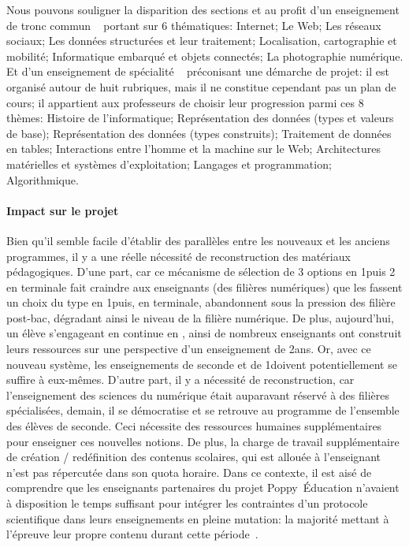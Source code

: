             Nous pouvons souligner la disparition des sections  et  au profit d'un enseignement de tronc commun ~ portant sur 6 thématiques: Internet; Le Web; Les réseaux sociaux; Les données structurées et leur traitement; Localisation, cartographie et mobilité; Informatique embarqué et objets connectés; La photographie numérique. Et d'un enseignement de spécialité ~ préconisant une démarche de projet: il est organisé autour de huit rubriques, mais il ne constitue cependant pas un plan de cours; il appartient aux professeurs de choisir leur progression parmi ces 8 thèmes: Histoire de l’informatique; Représentation des données (types et valeurs de base); Représentation des données (types construits); Traitement de données en tables; Interactions entre l’homme et la machine sur le Web; Architectures matérielles et systèmes d’exploitation; Langages et programmation; Algorithmique.
        \paragraph{Impact sur le projet}
            Bien qu'il semble facile d'établir des parallèles entre les nouveaux et les anciens programmes, il y a une réelle nécessité de reconstruction des matériaux pédagogiques. 
            D'une part, car ce mécanisme de sélection de 3 options en 1\iere puis 2 en terminale fait craindre aux enseignants (des filières numériques) que les  fassent un choix du type  en 1\iere puis, en terminale, abandonnent  sous la pression des filière post-bac, dégradant ainsi le niveau de la filière numérique. De plus, aujourd'hui, un élève s'engageant en  continue en , ainsi de nombreux enseignants ont construit leurs ressources sur une perspective d'un enseignement de 2ans. Or, avec ce nouveau système, les enseignements de seconde et de 1\iere doivent potentiellement se suffire à eux-mêmes. 
            D'autre part, il y a nécessité de reconstruction, car l'enseignement des sciences du numérique était auparavant réservé à des filières spécialisées, demain, il se démocratise et se retrouve au programme de l'ensemble des élèves de seconde. Ceci nécessite des ressources humaines supplémentaires pour enseigner ces nouvelles notions. 
            De plus, la charge de travail supplémentaire de création / redéfinition des contenus scolaires, qui est allouée à l'enseignant n'est pas répercutée dans son quota horaire.
            Dans ce contexte, il est aisé de comprendre que les enseignants partenaires du projet Poppy~Éducation n'avaient à disposition le temps suffisant pour intégrer les contraintes d'un protocole scientifique dans leurs enseignements en pleine mutation: la majorité mettant à l'épreuve leur propre contenu durant cette période~.
